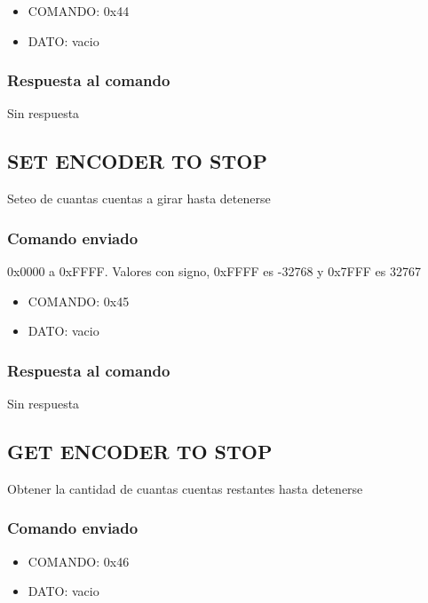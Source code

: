 \documentclass[a4paper,11pt]{article}
\begin{document}
\begin{itemize}
	\item{COMANDO:} 0x44
	\item{DATO:} vacio
\end{itemize}

\subsubsection*{Respuesta al comando}
\label{reset_encoder_respuesta}

Sin respuesta

\subsection{SET ENCODER TO STOP}
\label{set_encoder_to_stop}

Seteo de cuantas cuentas a girar hasta detenerse

\subsubsection*{Comando enviado}
\label{set_encoder_to_stop_comando_enviado}

0x0000 a 0xFFFF. Valores con signo, 0xFFFF es -32768 y 0x7FFF es 32767

\begin{itemize}
	\item{COMANDO:} 0x45
	\item{DATO:} vacio
\end{itemize}

\subsubsection*{Respuesta al comando}
\label{set_encoder_to_stop_respuesta}

Sin respuesta

\subsection{GET ENCODER TO STOP}
\label{get_encoder_to_stop}

Obtener la cantidad de cuantas cuentas restantes hasta detenerse

\subsubsection*{Comando enviado}
\label{get_encoder_to_stop_comando_enviado}

\begin{itemize}
	\item{COMANDO:} 0x46
	\item{DATO:} vacio
\end{itemize}
\end{document}
